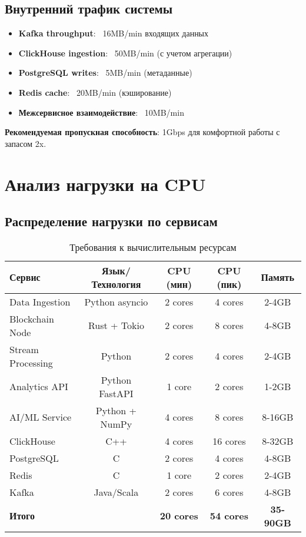 \documentclass[11pt,a4paper]{article}
\begin{document}
\subsection{Внутренний трафик системы}

\begin{itemize}
    \item \textbf{Kafka throughput}: ~16MB/min входящих данных
    \item \textbf{ClickHouse ingestion}: ~50MB/min (с учетом агрегации)
    \item \textbf{PostgreSQL writes}: ~5MB/min (метаданные)
    \item \textbf{Redis cache}: ~20MB/min (кэширование)
    \item \textbf{Межсервисное взаимодействие}: ~10MB/min
\end{itemize}

\textbf{Рекомендуемая пропускная способность}: 1Gbps для комфортной работы с запасом 2x.

\section{Анализ нагрузки на CPU}

\subsection{Распределение нагрузки по сервисам}

\begin{table}[H]
\centering
\small
\begin{tabular}{|l|c|c|c|c|}
\hline
\textbf{Сервис} & \textbf{Язык/Технология} & \textbf{CPU (мин)} & \textbf{CPU (пик)} & \textbf{Память} \\
\hline
Data Ingestion & Python asyncio & 2 cores & 4 cores & 2-4GB \\
Blockchain Node & Rust + Tokio & 2 cores & 8 cores & 4-8GB \\
Stream Processing & Python & 2 cores & 4 cores & 2-4GB \\
Analytics API & Python FastAPI & 1 core & 2 cores & 1-2GB \\
AI/ML Service & Python + NumPy & 4 cores & 8 cores & 8-16GB \\
ClickHouse & C++ & 4 cores & 16 cores & 8-32GB \\
PostgreSQL & C & 2 cores & 4 cores & 4-8GB \\
Redis & C & 1 core & 2 cores & 2-4GB \\
Kafka & Java/Scala & 2 cores & 6 cores & 4-8GB \\
\hline
\textbf{Итого} & & \textbf{20 cores} & \textbf{54 cores} & \textbf{35-90GB} \\
\hline
\end{tabular}
\caption{Требования к вычислительным ресурсам}
\end{table}
\end{document}
